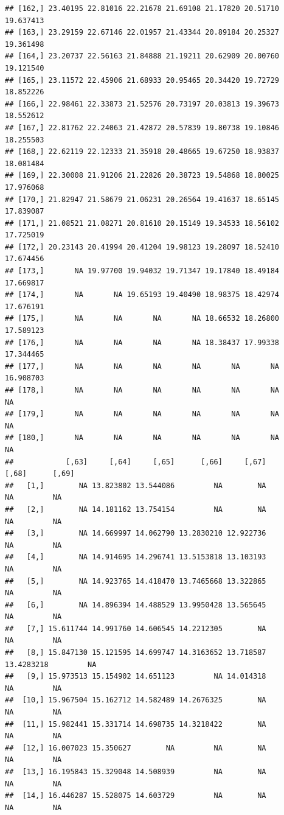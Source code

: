 \documentclass{article}\usepackage[]{graphicx}\usepackage[]{color}
\makeatletter
\newenvironment{kframe}{%
 \def\at@end@of@kframe{}%
 \ifinner\ifhmode%
  \def\at@end@of@kframe{\end{minipage}}%
  \begin{minipage}{\columnwidth}%
 \fi\fi%
 \def\FrameCommand##1{\hskip\@totalleftmargin \hskip-\fboxsep
 \colorbox{shadecolor}{##1}\hskip-\fboxsep
     \hskip-\linewidth \hskip-\@totalleftmargin \hskip\columnwidth}%
 \MakeFramed {\advance\hsize-\width
   \@totalleftmargin\z@ \linewidth\hsize
   \@setminipage}}%
 {\par\unskip\endMakeFramed%
 \at@end@of@kframe}
\newenvironment{knitrout}{}{} %
\makeatother
\begin{document}
\begin{knitrout}
\begin{kframe}
\begin{verbatim}
## [162,] 23.40195 22.81016 22.21678 21.69108 21.17820 20.51710 19.637413
## [163,] 23.29159 22.67146 22.01957 21.43344 20.89184 20.25327 19.361498
## [164,] 23.20737 22.56163 21.84888 21.19211 20.62909 20.00760 19.121540
## [165,] 23.11572 22.45906 21.68933 20.95465 20.34420 19.72729 18.852226
## [166,] 22.98461 22.33873 21.52576 20.73197 20.03813 19.39673 18.552612
## [167,] 22.81762 22.24063 21.42872 20.57839 19.80738 19.10846 18.255503
## [168,] 22.62119 22.12333 21.35918 20.48665 19.67250 18.93837 18.081484
## [169,] 22.30008 21.91206 21.22826 20.38723 19.54868 18.80025 17.976068
## [170,] 21.82947 21.58679 21.06231 20.26564 19.41637 18.65145 17.839087
## [171,] 21.08521 21.08271 20.81610 20.15149 19.34533 18.56102 17.725019
## [172,] 20.23143 20.41994 20.41204 19.98123 19.28097 18.52410 17.674456
## [173,]       NA 19.97700 19.94032 19.71347 19.17840 18.49184 17.669817
## [174,]       NA       NA 19.65193 19.40490 18.98375 18.42974 17.676191
## [175,]       NA       NA       NA       NA 18.66532 18.26800 17.589123
## [176,]       NA       NA       NA       NA 18.38437 17.99338 17.344465
## [177,]       NA       NA       NA       NA       NA       NA 16.908703
## [178,]       NA       NA       NA       NA       NA       NA        NA
## [179,]       NA       NA       NA       NA       NA       NA        NA
## [180,]       NA       NA       NA       NA       NA       NA        NA
##            [,63]     [,64]     [,65]      [,66]     [,67]      [,68]      [,69]
##   [1,]        NA 13.823802 13.544086         NA        NA         NA         NA
##   [2,]        NA 14.181162 13.754154         NA        NA         NA         NA
##   [3,]        NA 14.669997 14.062790 13.2830210 12.922736         NA         NA
##   [4,]        NA 14.914695 14.296741 13.5153818 13.103193         NA         NA
##   [5,]        NA 14.923765 14.418470 13.7465668 13.322865         NA         NA
##   [6,]        NA 14.896394 14.488529 13.9950428 13.565645         NA         NA
##   [7,] 15.611744 14.991760 14.606545 14.2212305        NA         NA         NA
##   [8,] 15.847130 15.121595 14.699747 14.3163652 13.718587 13.4283218         NA
##   [9,] 15.973513 15.154902 14.651123         NA 14.014318         NA         NA
##  [10,] 15.967504 15.162712 14.582489 14.2676325        NA         NA         NA
##  [11,] 15.982441 15.331714 14.698735 14.3218422        NA         NA         NA
##  [12,] 16.007023 15.350627        NA         NA        NA         NA         NA
##  [13,] 16.195843 15.329048 14.508939         NA        NA         NA         NA
##  [14,] 16.446287 15.528075 14.603729         NA        NA         NA         NA

\end{verbatim}
\end{kframe}
\end{knitrout}
\end{document}

